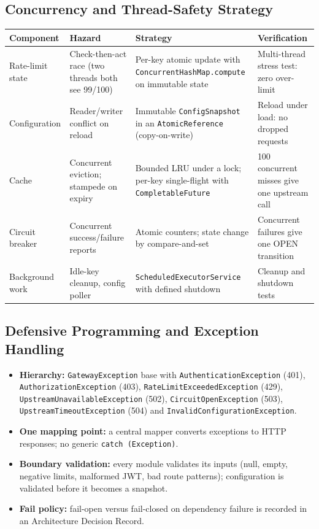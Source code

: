 \documentclass[12pt,a4paper]{article}
\newcommand{\cls}[1]{\nolinkurl{#1}}
\begin{document}
\subsection{Concurrency and Thread-Safety Strategy}
\label{sec:concurrency}
\begingroup
\small
\setlength{\tabcolsep}{4pt}
\begin{tabular}{L{2.6cm} L{3.6cm} L{4.4cm} L{3.2cm}}
\toprule
\textbf{Component} & \textbf{Hazard} & \textbf{Strategy} & \textbf{Verification} \\
\midrule
Rate-limit state & Check-then-act race (two threads both see 99/100) & Per-key atomic update with \cls{ConcurrentHashMap.compute} on immutable state & Multi-thread stress test: zero over-limit \\
Configuration & Reader/writer conflict on reload & Immutable \cls{ConfigSnapshot} in an \cls{AtomicReference} (copy-on-write) & Reload under load: no dropped requests \\
Cache & Concurrent eviction; stampede on expiry & Bounded LRU under a lock; per-key single-flight with \cls{CompletableFuture} & 100 concurrent misses give one upstream call \\
Circuit breaker & Concurrent success/failure reports & Atomic counters; state change by compare-and-set & Concurrent failures give one OPEN transition \\
Background work & Idle-key cleanup, config poller & \cls{ScheduledExecutorService} with defined shutdown & Cleanup and shutdown tests \\
\bottomrule
\end{tabular}
\endgroup

\subsection{Defensive Programming and Exception Handling}
\label{sec:defensive}
\begin{itemize}[noitemsep]
    \item \textbf{Hierarchy:} \cls{GatewayException} base with \cls{AuthenticationException} (401), \cls{AuthorizationException} (403), \cls{RateLimitExceededException} (429), \cls{UpstreamUnavailableException} (502), \cls{CircuitOpenException} (503), \cls{UpstreamTimeoutException} (504) and \cls{InvalidConfigurationException}.
    \item \textbf{One mapping point:} a central mapper converts exceptions to HTTP responses; no generic \cls{catch (Exception)}.
    \item \textbf{Boundary validation:} every module validates its inputs (null, empty, negative limits, malformed JWT, bad route patterns); configuration is validated before it becomes a snapshot.
    \item \textbf{Fail policy:} fail-open versus fail-closed on dependency failure is recorded in an Architecture Decision Record.
\end{itemize}
\end{document}
